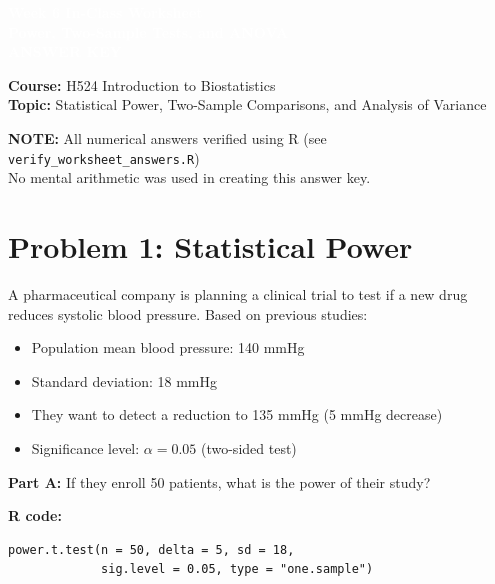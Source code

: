 \documentclass[11pt]{article}
\title{}
\author{}
\date{}
\begin{document}
\begin{tcolorbox}[colback=osaorange,colframe=black,boxrule=2pt,arc=0pt,left=6pt,right=6pt,top=10pt,bottom=10pt]
\centering
\textcolor{white}{\textbf{\Large Week 6 In-Class Worksheet}}\\
\textcolor{white}{\textbf{\large Power, Two-Sample Tests, and ANOVA}}\\
\textcolor{white}{\textbf{ANSWER KEY}}
\end{tcolorbox}

\vspace{8pt}

\noindent\textbf{Course:} H524 Introduction to Biostatistics\\
\textbf{Topic:} Statistical Power, Two-Sample Comparisons, and Analysis of Variance

\vspace{8pt}

\begin{tcolorbox}[colback=yellow!10,colframe=red,boxrule=1pt,arc=0pt]
\textbf{NOTE:} All numerical answers verified using R (see \texttt{verify\_worksheet\_answers.R})\\
No mental arithmetic was used in creating this answer key.
\end{tcolorbox}

\vspace{12pt}

\section{Problem 1: Statistical Power}

A pharmaceutical company is planning a clinical trial to test if a new drug reduces systolic blood pressure. Based on previous studies:
\begin{itemize}
\item Population mean blood pressure: 140 mmHg
\item Standard deviation: 18 mmHg
\item They want to detect a reduction to 135 mmHg (5 mmHg decrease)
\item Significance level: $\alpha = 0.05$ (two-sided test)
\end{itemize}

\vspace{6pt}

\textbf{Part A:} If they enroll 50 patients, what is the power of their study?

\textbf{R code:}
\begin{lstlisting}
power.t.test(n = 50, delta = 5, sd = 18,
             sig.level = 0.05, type = "one.sample")
\end{lstlisting}
\end{document}
